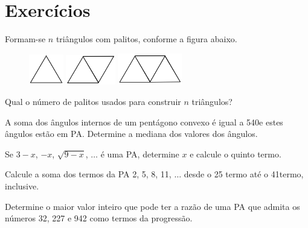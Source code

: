 \section{Exercícios}

\begin{exercise}
    Formam-se $n$ triângulos com palitos, conforme a figura abaixo.
\begin{center}

\begin{figure}[H]
    \center
    \includegraphics[width=1.5cm]{../../../res/img/fig-c05-exrPalitos-01.png}
    \includegraphics[width=2.15cm]{../../../res/img/fig-c05-exrPalitos-02.png}
    \includegraphics[width=2.8cm]{../../../res/img/fig-c05-exrPalitos-03.png}
\end{figure}

\end{center}
Qual o número de palitos usados para construir $n$ triângulos? 
\end{exercise}

\begin{exercise}
    A soma dos ângulos internos de um pentágono convexo é igual a
540\tdeg e estes ângulos estão em PA. Determine a mediana dos valores
dos ângulos.
\end{exercise}

\begin{exercise}
    Se $3-x$, $-x$, $\sqrt{9-x}$, $\dots$ é uma PA, determine $x$ e
calcule o quinto termo.
\end{exercise}

\begin{exercise}
    Calcule a soma dos termos da PA 2, 5, 8, 11, $\dots$ desde o 25\tdeg
termo até o 41\tdeg termo, inclusive.
\end{exercise}

\begin{exercise}
    Determine o maior valor inteiro que pode ter a razão de uma PA
que admita os números 32, 227 e 942 como termos da progressão.
\end{exercise}

